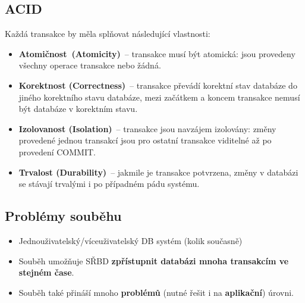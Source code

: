 \subsection{ACID}
Každá transakce by měla splňovat následující vlastnosti:
\begin{itemize}
\item\textbf{Atomičnost (Atomicity)} – transakce musí být atomická: jsou provedeny všechny operace transakce nebo žádná.
\item\textbf{Korektnost (Correctness)} – transakce převádí korektní stav databáze do jiného korektního stavu databáze, mezi začátkem a koncem transakce nemusí být databáze v korektním stavu.
\item\textbf{Izolovanost (Isolation)} – transakce jsou navzájem izolovány: změny provedené jednou transakcí jsou pro ostatní transakce viditelné až po provedení COMMIT. 
\item\textbf{Trvalost (Durability)} – jakmile je transakce potvrzena, změny v databázi se stávají trvalými i po případném pádu systému.
\end{itemize}

\subsection{Problémy souběhu}
\begin{itemize}
\item Jednouživatelský/víceuživatelský DB systém (kolik současně)
\item Souběh umožňuje SŘBD \textbf{zpřístupnit databázi mnoha transakcím ve stejném čase}.
\item Souběh také přináší mnoho \textbf{problémů} (nutné řešit i na \textbf{aplikační}) úrovni.
\end{itemize}

